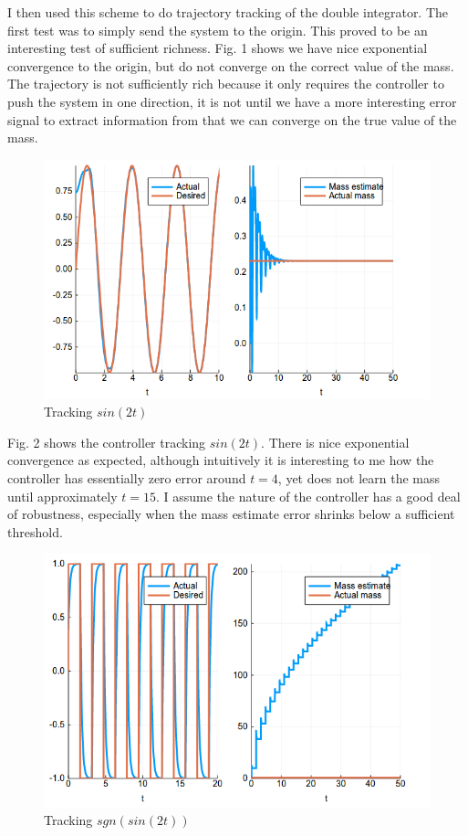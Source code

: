 \documentclass[12pt]{article}
\begin{document}
\newpage
\noindent
I then used this scheme to do trajectory tracking of the double integrator. The first test was to simply send the system to the origin. This proved to be an interesting test of sufficient richness. Fig. 1 shows we have nice exponential convergence to the origin, but do not converge on the correct value of the mass. The trajectory is not sufficiently rich because it only requires the controller to push the system in one direction, it is not until we have  a more interesting error signal to extract information from that we can converge on the true value of the mass.
\\

\begin{figure}[H]
    \centering
    \includegraphics[width=3.5in\textsize]{double_integrator_adaptation.png}
    \caption{Tracking $sin(2t)$}
    \label{fig:double_integrator_sine}
\end{figure}

\noindent
Fig. 2 shows the controller tracking $sin(2t)$. There is nice exponential convergence as expected, although intuitively it is interesting to me how the controller has essentially zero error around $t=4$, yet does not learn the mass until approximately $t=15$. I assume the nature of the controller has a good deal of robustness, especially when the mass estimate error shrinks below a sufficient threshold.
\\

\begin{figure}[h]
    \centering
    \includegraphics[width=3.5in\textsize]{double_integrator_square_wave.png}
    \caption{Tracking $sgn(sin(2t))$}
    \label{fig:double_integrator_sq}
\end{figure}
\end{document}
